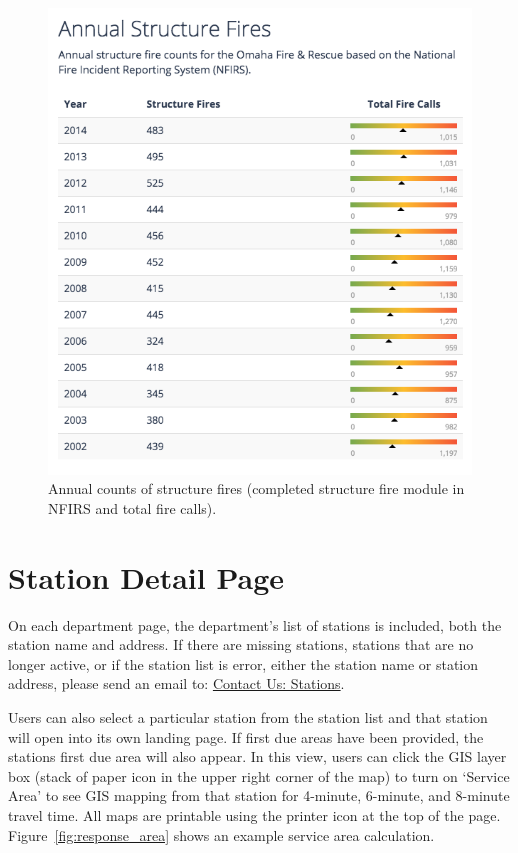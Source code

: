 \documentclass[12pt,oneside]{book}
\begin{document}
\begin{figure}[ht!]
\centering
\includegraphics[width=.65\columnwidth]{Figures/structure_fires}
\caption{Annual counts of structure fires (completed structure fire module in NFIRS and total fire calls).}
\label{fig:structure_fires}
\end{figure}

\section{Station Detail Page}

On each department page, the department's list of stations is included, both the station name and address. If there are missing stations, stations that are no longer active, or if the station list is error, either the station name or station address, please send an email to: \href{mailto:boundaries@firecares.org}{Contact Us: Stations}.

Users can also select a particular station from the station list and that station will open into its own landing page. If first due areas have been provided, the stations first due area will also appear. In this view, users can click the GIS layer box (stack of paper icon in the upper right corner of the map) to turn on `Service Area' to see GIS mapping from that station for 4-minute, 6-minute, and 8-minute travel time. All maps are printable using the printer icon at the top of the page. Figure~\ref{fig:response_area} shows an example service area calculation.
\end{document}
